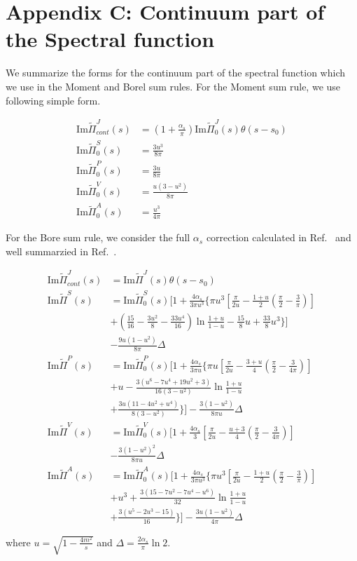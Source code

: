 \documentclass[aps,prc,superscriptaddress,showpacs,floatfix, nofootinbib,preprintnumbers,twocolumn]{revtex4}
\begin{document}
\section*{Appendix C: Continuum part of the Spectral function}
We summarize the forms for the continuum part of the spectral function which we use in the Moment and Borel sum rules.
For the Moment sum rule, we use following simple form.
\begin{small}
\begin{align}
\text{Im}\tilde{\Pi}^{J}_{cont}(s)&=(1+\frac{\alpha_s}{\pi})\text{Im}\tilde{\Pi}^{J}_{0}(s)\theta(s-s_0)\\
\text{Im}\tilde{\Pi}^{S}_{0}(s)&=\frac{3u^3}{8\pi}\\
\text{Im}\tilde{\Pi}^{P}_{0}(s)&=\frac{3u}{8\pi}\\
\text{Im}\tilde{\Pi}^{V}_{0}(s)&=\frac{u(3-u^2)}{8\pi}\\
\text{Im}\tilde{\Pi}^{A}_{0}(s)&=\frac{u^3}{4\pi}
\end{align}
\end{small}
For the Bore sum rule, we consider the full $\alpha_s$ correction calculated in Ref.~\cite{Reinders:1984sr} and well summarzied in Ref.~\cite{Morita:2009qk}. 
\begin{small}
\begin{align}
\text{Im}\tilde{\Pi}^{J}_{cont}(s)&=\text{Im}\tilde{\Pi}^{J}(s)\theta(s-s_0)\\
\text{Im}\tilde{\Pi}^{S}(s)&=\text{Im}\tilde{\Pi}^{S}_{0}(s)[1+\frac{4\alpha_s}{3\pi u^3}\{\pi u^3[\frac{\pi}{2u}-\frac{1+u}{2}(\frac{\pi}{2}-\frac{3}{\pi})]\nonumber\\
&+(\frac{15}{16}-\frac{3u^2}{8}-\frac{33u^4}{16})\ln\frac{1+u}{1-u}-\frac{15}{8}u+\frac{33}{8}u^3\}]\nonumber\\
&-\frac{9u(1-u^2)}{8\pi}\Delta\\
\text{Im}\tilde{\Pi}^{P}(s)&=\text{Im}\tilde{\Pi}^{P}_{0}(s)[1+\frac{4\alpha_s}{3 \pi u} \{\pi u[\frac{\pi}{2u}-\frac{3+u}{4}(\frac{\pi}{2}-\frac{3}{4\pi})]
\nonumber\\
&+u-\frac{3(u^6-7u^4+19u^2+3)}{16(3-u^2)} \ln \frac{1+u}{1-u}\nonumber\\
&+\frac{3u(11-4u^2+u^4)}{8(3-u^2)}\}]-\frac{3(1-u^2)}{8\pi u}\Delta\\
\text{Im}\tilde{\Pi}^{V}(s)&=\text{Im}\tilde{\Pi}^{V}_{0}(s)[1+\frac{4\alpha_s}{3}[\frac{\pi}{2u}-\frac{u+3}{4}(\frac{\pi}{2}-\frac{3}{4\pi})]\nonumber\\
&-\frac{3(1-u^2)^2}{8\pi u}\Delta\\
\text{Im}\tilde{\Pi}^{A}(s)&=\text{Im}\tilde{\Pi}^{A}_{0}(s)[1+\frac{4\alpha_s}{3\pi u^3}\{\pi u^3[\frac{\pi}{2u}-\frac{1+u}{2}(\frac{\pi}{2}-\frac{3}{\pi})]\nonumber\\
&+u^3+\frac{3(15-7u^2-7u^4-u^6)}{32}\ln\frac{1+u}{1-u}\nonumber\\
&+\frac{3(u^5-2u^3-15)}{16}    \}]-\frac{3u(1-u^2)}{4\pi}\Delta
\end{align}
\end{small}
where $u=\sqrt{1-\frac{4m^2}{s}}$ and $\Delta=\frac{2\alpha_s}{\pi}\ln 2$.
\end{document}
